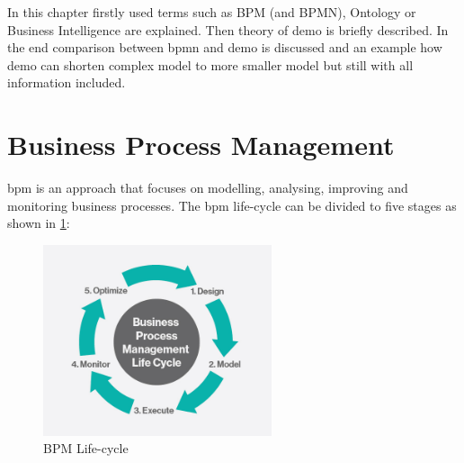 In this chapter firstly used terms such as BPM (and BPMN), Ontology or Business Intelligence are explained. Then theory of \gls{demo} is briefly described. In the end comparison between \gls{bpmn} and \gls{demo} is discussed and an example how \gls{demo} can shorten complex model to more smaller model but still with all information included. 

\section{Business Process Management}
\gls{bpm} is an approach that focuses on modelling, analysing, improving and monitoring business processes. 
The \gls{bpm} life-cycle can be divided to five stages as shown in \cref{fig:bpm-lifecycle}:

\begin{figure}[ht!]
	\centering
    \includegraphics[width=0.6\textwidth, keepaspectratio]{img/bpm-lifecycle.jpg}
    \caption{BPM Life-cycle\cite{harvey-koeppel-bpm-lifecycle-2015}}
    \label{fig:bpm-lifecycle}
\end{figure}

